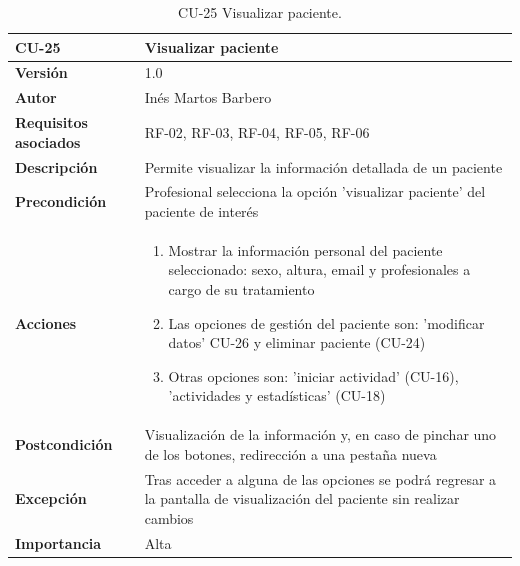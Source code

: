 \begin{table}[p]
	\centering
	\begin{tabularx}{\linewidth}{ p{} p{} }
		\toprule
		\textbf{CU-25}    & \textbf{Visualizar paciente}\\
		\toprule
		\textbf{Versión}              & 1.0    \\
		\textbf{Autor}                & Inés Martos Barbero \\
		\textbf{Requisitos asociados} & RF-02, RF-03, RF-04, RF-05, RF-06 \\
		\textbf{Descripción}          & Permite visualizar la información detallada de un paciente \\
		\textbf{Precondición}         & Profesional selecciona la opción 'visualizar paciente' del paciente de interés \\
		\textbf{Acciones}             &
		\begin{enumerate}
			\def\labelenumi{\arabic{enumi}.}
			\tightlist
			\item Mostrar la información personal del paciente seleccionado: sexo, altura, email y profesionales a cargo de su tratamiento
            \item Las opciones de gestión del paciente son: 'modificar datos' CU-26 y eliminar paciente (CU-24)
			\item Otras opciones son: 'iniciar actividad' (CU-16), 'actividades y estadísticas' (CU-18)
		\end{enumerate}\\
		\textbf{Postcondición}        & Visualización de la información y, en caso de pinchar uno de los botones, redirección a una pestaña nueva \\
		\textbf{Excepción}          & Tras acceder a alguna de las opciones se podrá regresar a la pantalla de visualización del paciente sin realizar cambios \\
		\textbf{Importancia}          & Alta \\
		\bottomrule
	\end{tabularx}
	\caption{CU-25 Visualizar paciente.}
\end{table}

